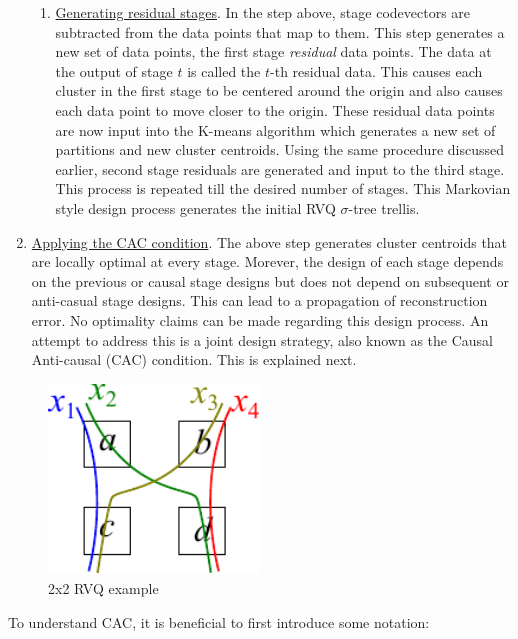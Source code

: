 \begin{Body}
\begin{enumerate}
\begin{enumerate}
\item \underline{Generating residual stages}.  In the step above, stage codevectors are subtracted from the data points that map to them.  This step generates a new set of data points, the first stage \emph{residual} data points.  The data at the output of stage $t$ is called the $t$-th residual data.  This causes each cluster in the first stage to be centered around the origin and also causes each data point to move closer to the origin.  These residual data points are now input into the K-means algorithm which generates a new set of partitions and new cluster centroids.  Using the same procedure discussed earlier, second stage residuals are generated and input to the third stage.  This process is repeated till the desired number of stages.  This Markovian style design process generates the initial RVQ $\sigma$-tree trellis.  
\end{enumerate}
\item \underline{Applying the CAC condition}.  The above step generates cluster centroids that are locally optimal at every stage.  Morever, the design of each stage depends on the previous or causal stage designs but does not depend on subsequent or anti-casual stage designs.   This can lead to a propagation of reconstruction error.  No optimality claims can be made regarding this design process.  An attempt to address this is a joint design strategy, also known as the Causal Anti-causal (CAC) condition.  This is explained next.
\end{enumerate}

\begin{figure}
\center
\includegraphics[width=0.5\textwidth]{thesis/RVQ_CAC_toyExample2_2x2.pdf}
\caption{2x2 RVQ example}
\label{fig:Figure1}
\end{figure}


To understand CAC, it is beneficial to first introduce some notation:


\end{Body}
